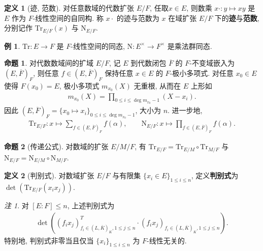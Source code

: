 \documentclass{MainStyle}
\theoremstyle{definition}
\newtheorem{example}{例}
\theoremstyle{definition}
\theoremstyle{definition}
\newtheorem{definition}{定义}
\theoremstyle{definition}
\newtheorem{proposition}{命题}
\theoremstyle{definition}
\theoremstyle{definition}
\theoremstyle{definition}
\theoremstyle{remark}
\newtheorem{remark}{注}
\theoremstyle{remark}
\begin{document}
\begin{definition}[迹, 范数]
    对任意数域的代数扩张 $E/F$, 任取$x\in E$, 则数乘 $x\cdot :y\mapsto xy$ 是 $E$ 作为 $F$-线性空间的自同构. 称 $x\cdot $ 的迹与范数为 $x$ 在域扩张 $E/F$ 下的\textbf{迹}与\textbf{范数}, 分别记作 $\mathrm{Tr}_{E/F}(x)$ 与 $\mathrm{N}_{E/F}$.
\end{definition}

\begin{example}
    $\mathrm{Tr}:E\to F$ 是 $F$-线性空间的同态, $\mathrm{N}:E^\times \to F^\times$ 是乘法群同态.
\end{example}

\begin{proposition}
    对代数数域间的扩域 $E/F$, 记 $E$ 到代数闭包 $\overline F$ 的 $F$-不变域嵌入为 $(E,\overline F)_F$, 则任意 $f\in (E,\overline F)_F$ 保持任意 $x\in E$ 的 $F$-极小多项式. 对任意 $x_0\in E$ 使得 $F(x_0)=E$, 极小多项式 $m_{x_0}(X)$ 无重根, 从而在 $E$ 上形如
    \begin{align*}
        m_{x_0}(X)=\prod_{0\leq i\leq \deg m_{x_0}-1}(X-x_i).
    \end{align*}
    因此 $(E,\overline F)_F=\{x_0\mapsto x_i\}_{0\leq i\leq \deg m_{x_0}-1}$, 大小为 $n$. 进一步地,
    \begin{align*}
        \mathrm{Tr}_{E/F}:x\mapsto \sum_{f\in (E,\overline F)_F} f(\alpha),\qquad \mathrm{N}_{E/F}:x\mapsto \prod_{f\in (E,\overline F)_F} f(\alpha).
    \end{align*}
\end{proposition}

\begin{proposition}[传递公式]
    对数域的扩张 $E/M/F$, 有 $\mathrm{Tr}_{E/F}=\mathrm{Tr}_{E/M}\circ \mathrm{Tr}_{M/F}$ 与 $\mathrm{N}_{E/F}=\mathrm{N}_{E/M}\circ \mathrm{N}_{M/F}$.
\end{proposition}

\begin{definition}[判别式]\label{discriminant}
    对数域扩张 $E/F$ 与有限集 $\{x_i\in E\}_{1\leq i\leq n}$, 定义\textbf{判别式}为 $\det (\mathrm{Tr}_{E/F}(x_ix_j))$.
\end{definition}

\begin{remark}\label{discriminant-est-square}
    对 $[E:F]\leq n$, 上述判别式为
    \begin{align*}
        \det \left((f_ix_j)_{f_i\in (L,\overline K)_K, 1\leq j\leq n}^T\cdot (f_ix_j)_{f_i\in (L,\overline K)_K, 1\leq j\leq n}\right).
    \end{align*}
    特别地, 判别式非零当且仅当 $\{x_i\}_{1\leq i\leq n}$ 为 $F$-线性无关的.
\end{remark}
\end{document}
